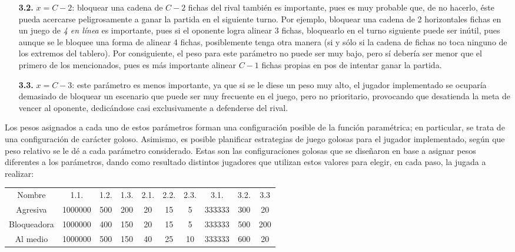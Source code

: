 \documentclass[12pt,a4paper]{article}
\begin{document}
\begin{itemize}
\begin{itemize}
                \item[\textbf{3.2.}] $x = C-2$: bloquear una cadena de $C-2$ fichas del rival también es importante, pues es muy probable que, de no hacerlo, éste pueda acercarse peligrosamente a ganar la partida en el siguiente turno. Por ejemplo, bloquear una cadena de 2 horizontales fichas en un juego de \textit{4 en línea} es importante, pues si el oponente logra alinear 3 fichas, bloquearlo en el turno siguiente puede ser inútil, pues aunque se le bloquee una forma de alinear 4 fichas, posiblemente tenga otra manera (si y sólo si la cadena de fichas no toca ninguno de los extremos del tablero). Por consiguiente, el peso para este parámetro no puede ser muy bajo, pero sí debería ser menor que el primero de los mencionados, pues es más importante alinear $C-1$ fichas propias en pos de intentar ganar la partida.
                \item[\textbf{3.3.}] $x = C-3$: este parámetro es menos importante, ya que si se le diese un peso muy alto, el jugador implementado se ocuparía demasiado de bloquear un escenario que puede ser muy frecuente en el juego, pero no prioritario, provocando que desatienda la meta de vencer al oponente, dedicándose casi exclusivamente a defenderse del rival.
            \end{itemize}
    \end{itemize}
    
    Los pesos asignados a cada uno de estos parámetros forman una configuración posible de la función paramétrica; en particular, se trata de una configuración de carácter goloso. Asimismo, es posible planificar estrategias de juego golosas para el jugador implementado, según que peso relativo se le dé a cada parámetro considerado. Estas son las configuraciones golosas que se diseñaron en base a asignar pesos diferentes a los parámetros, dando como resultado distintos jugadores que utilizan estos valores para elegir, en cada paso, la jugada a realizar:
    
    \begin{center}
		\begin{tabular}{ | c || c | c | c | c | c | c | c | c | c | }
		\hline
		Nombre &  1.1. &  1.2. &  1.3. &  2.1. &  2.2. &  2.3. &  3.1. &  3.2. &  3.3 \\ \hhline{|=#=|=|=|=|=|=|=|=|=|}
		    Agresiva &  1000000 &  500 &  200 &  20 &  15 &  5 &  333333 &  300 &  20 \\ \hline
		    Bloqueadora &  1000000 &  400 &  150 &  20 &  15 &  5 &  333333 &  500 &  200 \\ \hline
		    Al medio &  1000000 &  500 &  150 &  40 &  25 &  10 &  333333 &  600 &  20 \\ \hline
		\end{tabular}
    \end{center}
    
\end{document}
